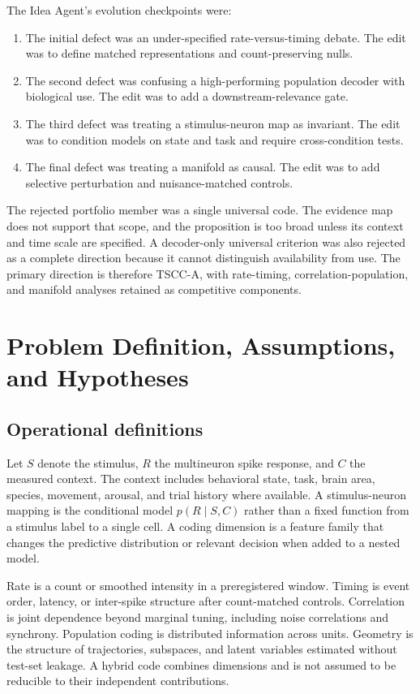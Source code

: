 \documentclass[conference]{IEEEtran}
\begin{document}
The Idea Agent's evolution checkpoints were:
\begin{enumerate}
\item The initial defect was an under-specified rate-versus-timing debate. The edit was to define matched representations and count-preserving nulls.
\item The second defect was confusing a high-performing population decoder with biological use. The edit was to add a downstream-relevance gate.
\item The third defect was treating a stimulus-neuron map as invariant. The edit was to condition models on state and task and require cross-condition tests.
\item The final defect was treating a manifold as causal. The edit was to add selective perturbation and nuisance-matched controls.
\end{enumerate}

The rejected portfolio member was a single universal code. The evidence map does not support that scope, and the proposition is too broad unless its context and time scale are specified. A decoder-only universal criterion was also rejected as a complete direction because it cannot distinguish availability from use. The primary direction is therefore TSCC-A, with rate-timing, correlation-population, and manifold analyses retained as competitive components.

\section{Problem Definition, Assumptions, and Hypotheses}
\subsection{Operational definitions}
Let $S$ denote the stimulus, $R$ the multineuron spike response, and $C$ the measured context. The context includes behavioral state, task, brain area, species, movement, arousal, and trial history where available. A stimulus-neuron mapping is the conditional model $p(R\mid S,C)$ rather than a fixed function from a stimulus label to a single cell. A coding dimension is a feature family that changes the predictive distribution or relevant decision when added to a nested model.

Rate is a count or smoothed intensity in a preregistered window. Timing is event order, latency, or inter-spike structure after count-matched controls. Correlation is joint dependence beyond marginal tuning, including noise correlations and synchrony. Population coding is distributed information across units. Geometry is the structure of trajectories, subspaces, and latent variables estimated without test-set leakage. A hybrid code combines dimensions and is not assumed to be reducible to their independent contributions.
\end{document}
